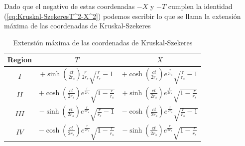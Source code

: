 Dado que el negativo de estas coordenadas $-X$ y $-T$ cumplen la identidad (\ref{eq:Kruskal-SzekeresT^2-X^2}) podemos escribir lo que se llama la extensión máxima de las coordenadas de Kruskal-Szekeres
\begin{table}[H]
    \centering
    \caption{Extensión máxima de las coordenadas de Kruskal-Szekeres}
    \begin{tabular}{|c|c|c|}
        \hline Region & $T$                                                                                & $X$                                                                                \\
        \hline$I$     & $+\sinh \left(\frac{c t}{2 r_s}\right)\frac{r}{2 r_s} \sqrt{\frac{r}{r_s}-1}$      & $+\cosh \left(\frac{c t}{2 r_s}\right) e^{\frac{r}{2 r_s}} \sqrt{\frac{r}{r_s}-1}$ \\
        \hline$I I$   & $+\cosh \left(\frac{c t}{2 r_s}\right) e^{\frac{r}{2 r_s}} \sqrt{1-\frac{r}{r_s}}$ & $+\sinh \left(\frac{c t}{2 r_s}\right) e^{\frac{r}{2 r_s}} \sqrt{1-\frac{r}{r_s}}$ \\
        \hline$I I I$ & $-\sinh \left(\frac{c t}{2 r_s}\right) e^{\frac{r}{2 r_s}} \sqrt{\frac{r}{r_s}-1}$ & $-\cosh \left(\frac{c t}{2 r_s}\right) e^{\frac{r}{2 r_s}} \sqrt{\frac{r}{r_s}-1}$ \\
        \hline$I V$   & $-\cosh \left(\frac{c t}{2 r_s}\right) e^{\frac{r}{2 r_s}} \sqrt{1-\frac{r}{r_s}}$ & $-\sinh \left(\frac{c t}{2 r_s}\right) e^{\frac{r}{2 r_s}} \sqrt{1-\frac{r}{r_s}}$ \\
        \hline
    \end{tabular}
\end{table}


